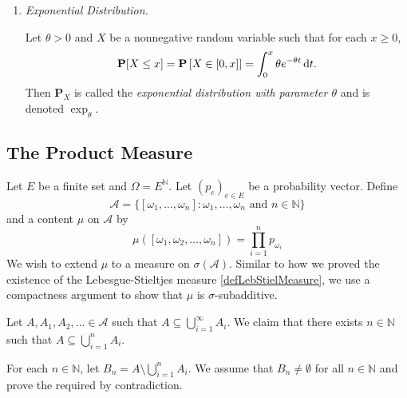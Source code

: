 \begin{enumerate}
    \item \textit{Exponential Distribution.}
    
    Let $\theta>0$ and $X$ be a nonnegative random variable such that for each $x\geq 0$,
    $$\textbf{P}[X\leq x]=\textbf{P}\left[X\in[0,x]\right]=\int_{0}^x\theta e^{-\theta t}\operatorname{d}\!{t}.$$
    Then $\textbf{P}_X$ is called the \textit{exponential distribution with parameter $\theta$} and is denoted $\exp_\theta$.
    
    
    
\end{enumerate}

\subsection{The Product Measure}

Let $E$ be a finite set and $\Omega=E^\mathbb{N}$. Let $(p_e)_{e\in E}$ be a probability vector. Define
$$\mathcal{A}=\{[\omega_1,\ldots,\omega_n]:\omega_1,\ldots,\omega_n\text{ and }n\in\mathbb{N}\}$$
and a content $\mu$ on $\mathcal{A}$ by
$$\mu([\omega_1,\omega_2,\ldots,\omega_n])=\prod_{i=1}^n p_{\omega_i}$$
We wish to extend $\mu$ to a measure on $\sigma(\mathcal{A})$. Similar to how we proved the existence of the Lebesgue-Stieltjes measure \cref{defLebStielMeasure}, we use a compactness argument to show that $\mu$ is $\sigma$-subadditive.

Let $A,A_1,A_2,\ldots\in\mathcal{A}$ such that $A\subseteq\bigcup_{i=1}^\infty A_i$. We claim that there exists $n\in\mathbb{N}$ such that $A\subseteq\bigcup_{i=1}^n A_i.$

For each $n\in\mathbb{N}$, let $B_n=A\setminus\bigcup_{i=1}^n A_i$. We assume that $B_n\neq\emptyset$ for all $n\in\mathbb{N}$ and prove the required by contradiction.

